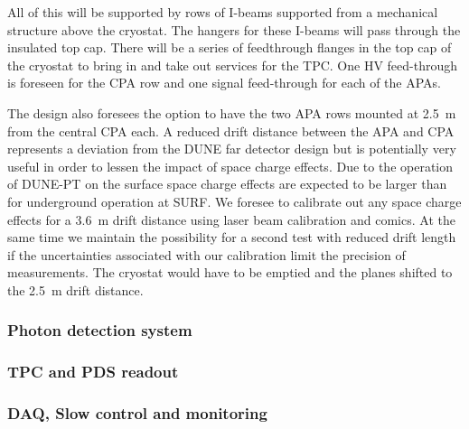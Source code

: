 All of this will be supported by rows of I-beams supported from a mechanical structure above the cryostat.  The hangers for these I-beams will pass through the insulated top cap.  There will be a series of feedthrough flanges in the top cap of the cryostat to bring in and take out services for the TPC.  One HV feed-through is foreseen for the CPA row and one signal feed-through for each of the APAs.

The design also foresees the option to have the two APA rows mounted at 2.5~m from the central CPA each.
A reduced drift distance between the APA and CPA represents a deviation from the DUNE far detector design but is potentially very
useful in order to lessen the impact of space charge effects.
Due to the operation of DUNE-PT on the surface space charge 
 effects are expected to be larger than for underground operation at SURF.
We foresee to calibrate out any space charge effects for a 3.6~m drift distance using laser beam calibration and comics. 
At the same time we maintain the  possibility for a second test with reduced drift length if the uncertainties associated 
with our calibration limit the precision of measurements.
The cryostat would have to be emptied and the planes shifted to the 2.5~m drift distance.
 









\subsubsection{Photon detection system}


\subsubsection{TPC and PDS readout}


\subsubsection{DAQ, Slow control and monitoring}





